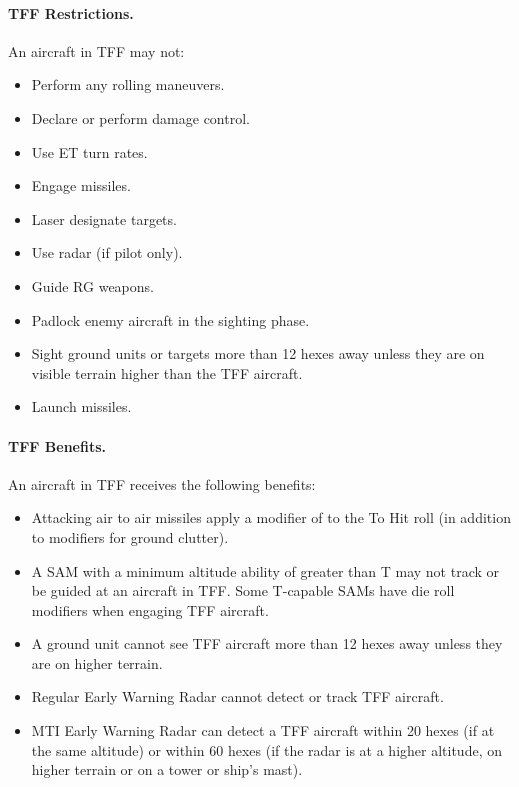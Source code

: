 \paragraph{TFF Restrictions.}  An aircraft in TFF may not:

\begin{itemize}
    \item Perform any rolling maneuvers.
    \item Declare or perform damage control.
    \item Use ET turn rates.
    \item Engage missiles.
    \item Laser designate targets.
    \item Use radar (if pilot only).
    \item Guide RG weapons.
    \item Padlock enemy aircraft in the sighting phase.
    \item Sight ground units or targets more than 12 hexes away unless they are on visible terrain higher than the TFF aircraft.
    \item Launch missiles.
\end{itemize}

\paragraph{TFF Benefits.} An aircraft in TFF receives the following benefits:

\begin{itemize}
    \item Attacking air to air missiles apply a modifier of  to the To Hit roll (in addition to modifiers for ground clutter).
    \item A SAM with a minimum altitude ability of greater than T may not track or be guided at an aircraft in TFF. Some T-capable SAMs have die roll modifiers when engaging TFF aircraft.
    \item A ground unit cannot see TFF aircraft more than 12 hexes away unless they are on higher terrain.
    \item Regular Early Warning Radar cannot detect or track TFF aircraft.
    \item MTI Early Warning Radar can detect a TFF aircraft within 20 hexes (if at the same altitude) or within 60 hexes (if the radar is at a higher altitude, on higher terrain or on a tower or ship's mast).
\end{itemize}
